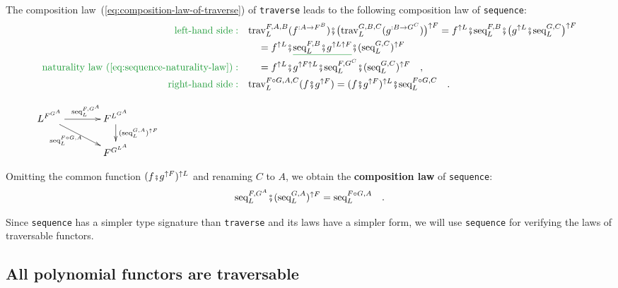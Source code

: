 The composition law~(\ref{eq:composition-law-of-traverse}) of \lstinline!traverse!
leads to the following composition law of \lstinline!sequence!:
\begin{align*}
{\color{greenunder}\text{left-hand side}:}\quad & \text{trav}_{L}^{F,A,B}(f^{:A\rightarrow F^{B}})\bef\big(\text{trav}_{L}^{G,B,C}(g^{:B\rightarrow G^{C}})\big)^{\uparrow F}=f^{\uparrow L}\bef\text{seq}_{L}^{F,B}\bef\big(g^{\uparrow L}\bef\text{seq}_{L}^{G,C}\big)^{\uparrow F}\\
 & \quad=f^{\uparrow L}\bef\gunderline{\text{seq}_{L}^{F,B}\bef g^{\uparrow L\uparrow F}}\bef(\text{seq}_{L}^{G,C})^{\uparrow F}\\
{\color{greenunder}\text{naturality law~(\ref{eq:sequence-naturality-law})}:}\quad & \quad=f^{\uparrow L}\bef g^{\uparrow F\uparrow L}\bef\text{seq}_{L}^{F,G^{C}}\bef(\text{seq}_{L}^{G,C})^{\uparrow F}\quad,\\
{\color{greenunder}\text{right-hand side}:}\quad & \text{trav}_{L}^{F\circ G,A,C}(f\bef g^{\uparrow F})=(f\bef g^{\uparrow F})^{\uparrow L}\bef\text{seq}_{L}^{F\circ G,C}\quad.
\end{align*}

\begin{wrapfigure}{l}{0.3\columnwidth}%
\vspace{-1.7\baselineskip}
$\xymatrix{\xyScaleY{1.4pc}\xyScaleX{3.0pc}L^{F^{G^{A}}}\ar[r]\sp(0.55){\text{seq}_{L}^{F,G^{A}}}\ar[rd]\sb(0.4){\text{seq}_{L}^{F\circ G,A}} & F^{L^{G^{A}}}\ar[d]\sp(0.4){(\text{seq}_{L}^{G,A})^{\uparrow F}}\\
 & F^{G^{L^{A}}}
}
$\vspace{-1.9\baselineskip}
\end{wrapfigure}%

\noindent Omitting the common function $(f\bef g^{\uparrow F})^{\uparrow L}$
and renaming $C$ to $A$, we obtain the \textbf{composition
law} of \lstinline!sequence!:
\begin{equation}
\text{seq}_{L}^{F,G^{A}}\bef(\text{seq}_{L}^{G,A})^{\uparrow F}=\text{seq}_{L}^{F\circ G,A}\quad.\label{eq:composition-law-of-sequence}
\end{equation}

Since \lstinline!sequence! has a simpler type signature than \lstinline!traverse!
and its laws have a simpler form, we will use \lstinline!sequence!
for verifying the laws of traversable functors. 

\subsection{All polynomial functors are traversable\label{subsec:All-polynomial-functors-are-traversable}}

